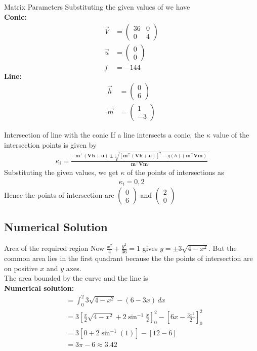 \documentclass{beamer}
\providecommand{\sbrak}[1]{\ensuremath{{}\left[#1\right]}}
\providecommand{\brak}[1]{\ensuremath{\left(#1\right)}}
\theoremstyle{remark}
\newcommand{\myvec}[1]{\ensuremath{\begin{pmatrix}#1\end{pmatrix}}}
\let\vec\mathbf
\numberwithin{equation}{section}
\begin{document}
        \begin{frame}{Matrix Parameters}
            Substituting the given values of we have\\
\textbf{Conic:}
\begin{align}
    \Vec{V} &= \myvec{36 & 0\\ 0 & 4}\\
    \Vec{u} &= \myvec{0 \\ 0}\\
    f &= -144
\end{align}
\textbf{Line:}
\begin{align}
    \Vec{h} &= \myvec{0 \\ 6}\\
    \Vec{m} &= \myvec{1 \\ -3}
\end{align}
        \end{frame}
        \begin{frame}{Intersection of line with the conic}
            If a line intersects a conic, the $\kappa$ value of the intersection points is given by
\begin{align}
    \kappa_i=\frac{-\vec{m}^{\top}\brak{\vec{Vh}+\vec{u}}\pm\sqrt{\sbrak{\vec{m}^{\top}\brak{\vec{Vh}+\vec{u}}}^2-g\brak{h}\brak{\vec{m}^{\top}\vec{Vm}}}}{\vec{m}^{\top}\vec{Vm}}
\end{align}
Substituting the given values, we get $\kappa$ of the points of intersections as 
\begin{align}
    \kappa_i = 0, 2
\end{align}
Hence the points of intersection are $\myvec{0 \\ 6}$ and $\myvec{2 \\ 0}$\\
        \end{frame}
        \subsection{Numerical Solution}
        \begin{frame}{Area of the required region}
            Now $\frac{x^2}{4}+\frac{y^2}{36}= 1$ gives $y = \pm 3\sqrt{4 - x^2}$. But the common area lies in the first quadrant because the the points of intersection are on positive $x$ and $y$ axes.\\

The area bounded by the curve and the line is \\
\textbf{Numerical solution:}
\begin{align}
    &= \int_0^2{3\sqrt{4 - x^2} - \brak{6 - 3x}\,dx}\\
    &= 3\sbrak{\frac{x}{2}\sqrt{4 - x^2} + 2\sin^{-1}{\frac{x}{2}}}_0^2 - \sbrak{6x - \frac{3x^2}{2}}_0^2\\
    &= 3\sbrak{0 + 2\sin^{-1}{\brak{1}}} - \sbrak{12 - 6}\\
    &= 3\pi - 6 \approx 3.42
\end{align}
        \end{frame}
\end{document}
